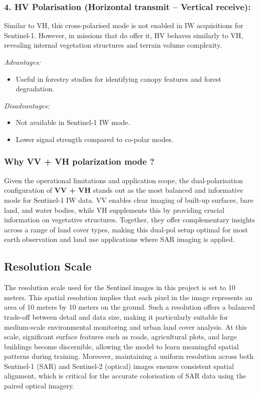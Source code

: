 \subsubsection{\textbf{4. HV Polarisation (Horizontal transmit – Vertical receive):}}

Similar to VH, this cross-polarised mode is not enabled in IW acquisitions for Sentinel-1. However, in missions that do offer it, HV behaves similarly to VH, revealing internal vegetation structures and terrain volume complexity.


\textit{Advantages:}
\begin{itemize}
    \item Useful in forestry studies for identifying canopy features and forest degradation.
\end{itemize}

\textit{Disadvantages:}
\begin{itemize}
    \item Not available in Sentinel-1 IW mode.
    \item Lower signal strength compared to co-polar modes.
\end{itemize}

\subsubsection{\textbf{Why VV + VH polarization mode ?}}

Given the operational limitations and application scope, the dual-polarisation configuration of \textbf{VV + VH} stands out as the most balanced and informative mode for Sentinel-1 IW data. VV enables clear imaging of built-up surfaces, bare land, and water bodies, while VH supplements this by providing crucial information on vegetative structures. Together, they offer complementary insights across a range of land cover types, making this dual-pol setup optimal for most earth observation and land use applications where SAR imaging is applied.



\subsection{Resolution Scale}


The resolution scale used for the Sentinel images in this project is set to 10 meters. This spatial resolution implies that each pixel in the image represents an area of 10 meters by 10 meters on the ground. Such a resolution offers a balanced trade-off between detail and data size, making it particularly suitable for medium-scale environmental monitoring and urban land cover analysis. At this scale, significant surface features such as roads, agricultural plots, and large buildings become discernible, allowing the model to learn meaningful spatial patterns during training. Moreover, maintaining a uniform resolution across both Sentinel-1 (SAR) and Sentinel-2 (optical) images ensures consistent spatial alignment, which is critical for the accurate colorisation of SAR data using the paired optical imagery.


